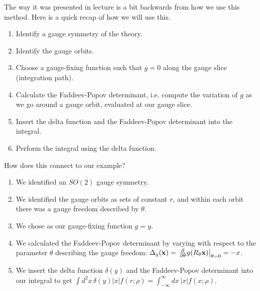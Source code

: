 The way it was presented in lecture is a bit backwards from how we use this method. Here is a quick recap of how we will use this.
\begin{enumerate}
    \item Identify a gauge symmetry of the theory.
    \item Identify the gauge orbits.
    \item Choose a gauge-fixing function such that $g=0$ along the gauge slice (integration path).
    \item Calculate the Faddeev-Popov determinant, i.e. compute the variation of $g$ as we go around a gauge orbit, evaluated at our gauge slice.
    \item Insert the delta function and the Faddeev-Popov determinant into the integral.
    \item Perform the integral using the delta function.
\end{enumerate}
How does this connect to our example?
\begin{enumerate}
    \item We identified an $SO(2)$ gauge symmetry.
    \item We identified the gauge orbits as sets of constant $r$, and within each orbit there was a gauge freedom described by $\theta$.
    \item We chose as our gauge-fixing function $g=y$.
    \item We calculated the Faddeev-Popov determinant by varying with respect to the parameter $\theta$ describing the gauge freedom: $\Delta_g (\vec x)=\left.\P{}{\theta}g(R_\theta \vec x)\right|_{\theta=0}=-x$.
    \item We insert the delta function $\delta(y)$ and the Faddeev-Popov determinant into our integral to get $\int d^2x \,\delta(y)|x| f(r;\rho)= \int_{-\infty}^\infty dx \, |x| f(x;\rho)$.
\end{enumerate}